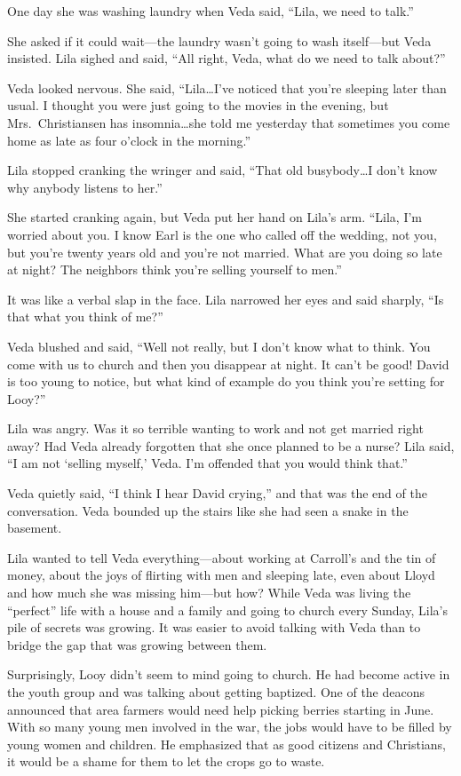 \documentclass[
  letterpaper,
]{book}
\begin{document}
One day she was washing laundry when Veda said, ``Lila, we need to
talk.''

She asked if it could wait---the laundry wasn't going to wash
itself---but Veda insisted. Lila sighed and said, ``All right, Veda,
what do we need to talk about?''

Veda looked nervous. She said, ``Lila\ldots I've noticed that you're
sleeping later than usual. I thought you were just going to the movies
in the evening, but Mrs.~Christiansen has insomnia\ldots she told me
yesterday that sometimes you come home as late as four o'clock in the
morning.''

Lila stopped cranking the wringer and said, ``That old busybody\ldots I
don't know why anybody listens to her.''

She started cranking again, but Veda put her hand on Lila's arm. ``Lila,
I'm worried about you. I know Earl is the one who called off the
wedding, not you, but you're twenty years old and you're not married.
What are you doing so late at night? The neighbors think you're selling
yourself to men.''

It was like a verbal slap in the face. Lila narrowed her eyes and said
sharply, ``Is that what you think of me?''

Veda blushed and said, ``Well not really, but I don't know what to
think. You come with us to church and then you disappear at night. It
can't be good! David is too young to notice, but what kind of example do
you think you're setting for Looy?''

Lila was angry. Was it so terrible wanting to work and not get married
right away? Had Veda already forgotten that she once planned to be a
nurse? Lila said, ``I am not `selling myself,' Veda. I'm offended that
you would think that.''

Veda quietly said, ``I think I hear David crying,'' and that was the end
of the conversation. Veda bounded up the stairs like she had seen a
snake in the basement.

Lila wanted to tell Veda everything---about working at Carroll's and the
tin of money, about the joys of flirting with men and sleeping late,
even about Lloyd and how much she was missing him---but how? While Veda
was living the ``perfect'' life with a house and a family and going to
church every Sunday, Lila's pile of secrets was growing. It was easier
to avoid talking with Veda than to bridge the gap that was growing
between them.

Surprisingly, Looy didn't seem to mind going to church. He had become
active in the youth group and was talking about getting baptized. One of
the deacons announced that area farmers would need help picking berries
starting in June. With so many young men involved in the war, the jobs
would have to be filled by young women and children. He emphasized that
as good citizens and Christians, it would be a shame for them to let the
crops go to waste.
\end{document}
